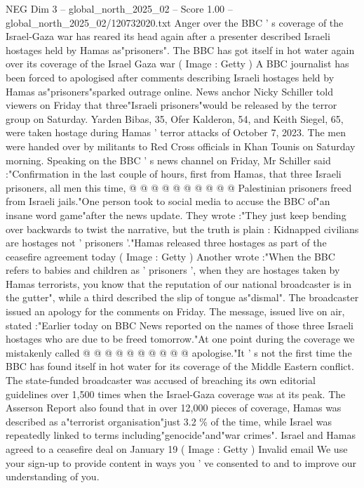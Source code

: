 \begin{textsample}{NEG Dim 3 – global\_north\_2025\_02 – Score 1.00 – global\_north\_2025\_02/120732020.txt}  \label{ex:f3_neg_178}
Anger over the BBC ' s coverage of the Israel-Gaza war has reared its head again after a presenter described Israeli hostages held by Hamas as"prisoners".
The BBC has got itself in hot water again over its coverage of the Israel Gaza war ( Image : Getty ) A BBC journalist has been forced to apologised after comments describing Israeli hostages held by Hamas as"prisoners"sparked outrage online.
News anchor Nicky Schiller told viewers on Friday that three"Israeli prisoners"would be released by the terror group on Saturday.
Yarden Bibas, 35, Ofer Kalderon, 54, and Keith Siegel, 65, were taken hostage during Hamas ' terror attacks of October 7, 2023.
The men were handed over by militants to Red Cross officials in Khan Tounis on Saturday morning.
Speaking on the BBC ' s news channel on Friday, Mr Schiller said :"Confirmation in the last couple of hours, first from Hamas, that three Israeli prisoners, all men this time, @ @ @ @ @ @ @ @ @ @ Palestinian prisoners freed from Israeli jails."One person took to social media to accuse the BBC of"an insane word game"after the news update.
They wrote :"They just keep bending over backwards to twist the narrative, but the truth is plain : Kidnapped civilians are hostages not ' prisoners '."Hamas released three hostages as part of the ceasefire agreement today ( Image : Getty ) Another wrote :"When the BBC refers to babies and children as ' prisoners ', when they are hostages taken by Hamas terrorists, you know that the reputation of our national broadcaster is in the gutter", while a third described the slip of tongue as"dismal".
The broadcaster issued an apology for the comments on Friday.
The message, issued live on air, stated :"Earlier today on BBC News reported on the names of those three Israeli hostages who are due to be freed tomorrow."At one point during the coverage we mistakenly called @ @ @ @ @ @ @ @ @ @ apologise."It ' s not the first time the BBC has found itself in hot water for its coverage of the Middle Eastern conflict.
The state-funded broadcaster was accused of breaching its own editorial guidelines over 1,500 times when the Israel-Gaza coverage was at its peak.
The Asserson Report also found that in over 12,000 pieces of coverage, Hamas was described as a"terrorist organisation"just 3.2 \% of the time, while Israel was repeatedly linked to terms including"genocide"and"war crimes".
Israel and Hamas agreed to a ceasefire deal on January 19 ( Image : Getty ) Invalid email We use your sign-up to provide content in ways you ' ve consented to and to improve our understanding of you.

\end{textsample}
